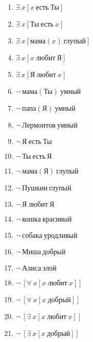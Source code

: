 \documentclass{article}
\begin{document}
\begin{enumerate}
\item $\exists \ x[x \ \text{есть} \ \text{Ты}]$

\item $\exists \ x[\text{Ты} \ \text{есть} \ x]$

\item $\exists \ x[\text{мама}(x) \ \text{глупый}]$

\item $\exists \ x[x \ \text{любит} \ \text{Я}]$

\item $\exists \ x[\text{Я} \ \text{любит} \ x]$

\item $\neg \ \text{мама}(\text{Ты}) \ \text{умный}$

\item $\neg \ \text{папа}(\text{Я}) \ \text{умный}$

\item $\neg \ \text{Лермонтов} \ \text{умный}$

\item $\neg \ \text{Я} \ \text{есть} \ \text{Ты}$

\item $\neg \ \text{Ты} \ \text{есть} \ \text{Я}$

\item $\neg \ \text{мама}(\text{Я}) \ \text{глупый}$

\item $\neg \ \text{Пушкин} \ \text{глупый}$

\item $\neg \ \text{Я} \ \text{любит} \ \text{Я}$

\item $\neg \ \text{кошка} \ \text{красивый}$

\item $\neg \ \text{собака} \ \text{уродливый}$

\item $\neg \ \text{Миша} \ \text{добрый}$

\item $\neg \ \text{Алиса} \ \text{злой}$

\item $\neg \ [\forall \ x[x \ \text{любит} \ x]]$

\item $\neg \ [\forall \ x[x \ \text{добрый}]]$

\item $\neg \ [\exists \ x[x \ \text{любит} \ x]]$

\item $\neg \ [\exists \ x[x \ \text{добрый}]]$

\end{enumerate}
\end{document}
